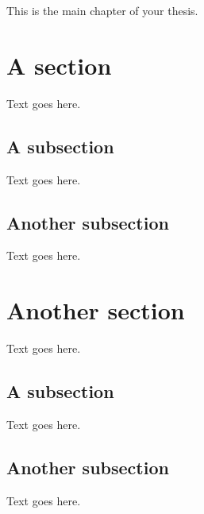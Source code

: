 This is the main chapter of your thesis.


\section{A section}
Text goes here.

\subsection{A subsection}
Text goes here.

\subsection{Another subsection}
Text goes here.


\section{Another section}
Text goes here.

\subsection{A subsection}
Text goes here.

\subsection{Another subsection}
Text goes here.
